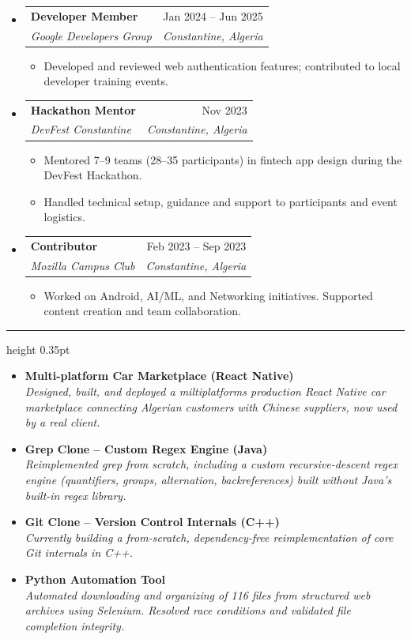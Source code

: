 \documentclass[10pt]{article}
\makeatletter
\newcommand{\resumesection}[1]{%
  \vspace{1.0ex}
  \noindent{\large\scshape #1}\par
  \vspace{0.5ex}
  \hrule height 0.35pt
  \vspace{1.0ex}
}
\newcommand{\resumeentry}[4]{%
  \item[]
  \begin{tabular*}{\textwidth}{@{\extracolsep{\fill}}p{0.78\textwidth}r}
    {\textbf{#1}} & {#2} \\
    {\textit{#3}} & {\textit{#4}} \\
  \end{tabular*}
  \vspace{-0.8ex}
}
\newcommand{\resumesubentry}[2]{%
  \item[] {\textbf{#1}} \\
  \textit{#2} \\
  \vspace{-0.35ex}
}
\makeatother
\begin{document}
\begin{itemize}
    \resumeentry{Developer Member}{Jan 2024 -- Jun 2025}{Google Developers Group}{Constantine, Algeria}
    \begin{itemize}[leftmargin=1.15em,label=\textbullet]
        \item Developed and reviewed web authentication features; contributed to local developer training events.
    \end{itemize}

    \resumeentry{Hackathon Mentor}{Nov 2023}{DevFest Constantine}{Constantine, Algeria}
    \begin{itemize}[leftmargin=1.15em,label=\textbullet]
        \item Mentored 7–9 teams (28–35 participants) in fintech app design during the DevFest Hackathon.
        \item Handled technical setup, guidance and support to participants and event logistics.
    \end{itemize}

    \resumeentry{Contributor}{Feb 2023 -- Sep 2023}{Mozilla Campus Club}{Constantine, Algeria}
    \begin{itemize}[leftmargin=1.15em,label=\textbullet]
        \item Worked on Android, AI/ML, and Networking initiatives. Supported content creation and team collaboration.
    \end{itemize}
\end{itemize}

\resumesection{Selected Projects}
\begin{itemize}
    \resumesubentry{Multi-platform Car Marketplace (React Native)}{
      Designed, built, and deployed a miltiplatforms production React Native car marketplace connecting Algerian customers with Chinese suppliers, now used by a real client.
    }

    \resumesubentry{Grep Clone -- Custom Regex Engine (Java)}{
      Reimplemented grep from scratch, including a custom recursive-descent regex engine (quantifiers, groups, alternation, backreferences) built without Java's built-in regex library.
    }

    \resumesubentry{Git Clone -- Version Control Internals (C++)}{
      Currently building a from-scratch, dependency-free reimplementation of core Git internals in C++.
    }

    \resumesubentry{Python Automation Tool}{
      Automated downloading and organizing of 116 files from structured web archives using Selenium. Resolved race conditions and validated file completion integrity.
    }
\end{itemize}
\end{document}
